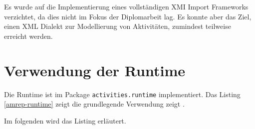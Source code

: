 Es wurde auf die Implementierung eines vollständigen XMI Import Frameworks verzichtet, da dies nicht im Fokus der Diplomarbeit lag. Es konnte aber das Ziel, einen XML Dialekt zur Modellierung von Aktivitäten, zumindest teilweise erreicht werden.


\section{Verwendung der Runtime}\label{amrep-use-runtime}
Die Runtime ist im Package \texttt{activities.runtime} implementiert. Das Listing \ref{amrep-runtime} zeigt die grundlegende Verwendung zeigt .


Im folgenden wird das Listing erläutert.

